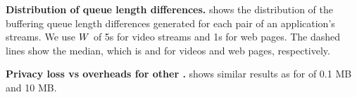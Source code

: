 {\small
\textbf{Distribution of queue length differences.}
 shows the distribution of the
buffering queue length differences generated for each pair of an
application's streams. We use $W$ of 5s
for video streams and 1s for web pages.
The dashed lines show the median, which is  and
 for videos and web pages, respectively.

\textbf{Privacy loss vs overheads for other \update{$\qsens$}.}
 shows similar results as
 for \update{$\qsens$} of 0.1 MB and 10 MB.
}

